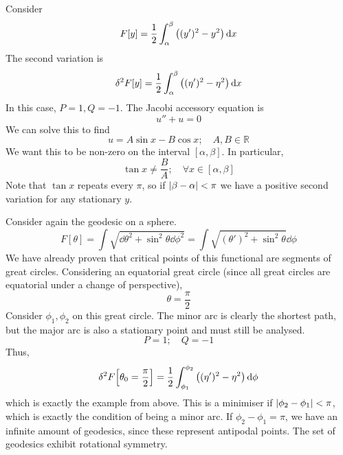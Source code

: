 \begin{example}
    Consider
    \[ F[y] = \frac{1}{2} \int_\alpha^\beta \qty( (y')^2 - y^2 ) \dd{x} \]
    The second variation is
    \[ \delta^2 F[y] = \frac{1}{2} \int_\alpha^\beta \qty( (\eta')^2 - \eta^2 ) \dd{x} \]
    In this case, \( P = 1, Q = -1 \).
    The Jacobi accessory equation is
    \[ u'' + u = 0 \]
    We can solve this to find
    \[ u = A \sin x - B \cos x;\quad A,B \in \mathbb R \]
    We want this to be non-zero on the interval \( [\alpha, \beta] \).
    In particular,
    \[ \tan x \neq \frac{B}{A};\quad \forall x \in [\alpha, \beta] \]
    Note that \( \tan x \) repeats every \( \pi \), so if \( \abs{\beta - \alpha} < \pi \) we have a positive second variation for any stationary \( y \).
\end{example}

\begin{example}
    Consider again the geodesic on a sphere.
    \[ F[\theta] = \int \sqrt{\dd{\theta}^2 + \sin^2\theta \dd{\phi}^2} = \int \sqrt{(\theta')^2 + \sin^2\theta}\dd{\phi} \]
    We have already proven that critical points of this functional are segments of great circles.
    Considering an equatorial great circle (since all great circles are equatorial under a change of perspective),
    \[ \theta = \frac{\pi}{2} \]
    Consider \( \phi_1, \phi_2 \) on this great circle.
    The minor arc is clearly the shortest path, but the major arc is also a stationary point and must still be analysed.
    \[ P = 1;\quad Q = -1 \]
    Thus,
    \[ \delta^2 F\qty[\theta_0 = \frac{\pi}{2}] = \frac{1}{2} \int_{\phi_1}^{\phi_2} \qty((\eta')^2 - \eta^2) \dd{\phi} \]
    which is exactly the example from above.
    This is a minimiser if \( \abs{\phi_2 - \phi_1} < \pi \), which is exactly the condition of being a minor arc.
    If \( \phi_2 - \phi_1 = \pi \), we have an infinite amount of geodesics, since these represent antipodal points.
    The set of geodesics exhibit rotational symmetry.
\end{example}
